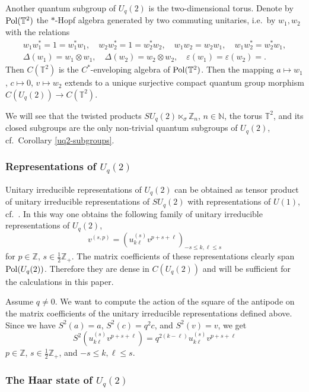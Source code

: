 \documentclass[12pt]{amsart}
\theoremstyle{definition}
\theoremstyle{remark}
\numberwithin{equation}{section}
\begin{document}
Another quantum subgroup of
$U_q(2)$ is the two-dimensional torus. Denote by ${\rm Pol}(\mathbb{T}^2)$ the
$*$-Hopf algebra generated by two commuting unitaries, i.e.\ by $w_1,w_2$ with
the relations
\begin{gather*}
w_1w_1^*=1=w_1^*w_1, \quad w_2w_2^*=1=w_2^*w_2,\quad w_1w_2=w_2w_1,\quad
w_1w_2^*=w_2^*w_1, \\
\Delta (w_1)=w_1\otimes w_1,\quad \Delta(w_2)=w_2\otimes w_2, \quad \varepsilon(w_1)=\varepsilon(w_2)=.
\end{gather*}
Then $C(\mathbb{T}^2)$ is the
$C^*$-enveloping algebra of ${\rm Pol}(\mathbb{T}^2)$. Then the mapping $a\mapsto w_1$, $c\mapsto 0$,
$v\mapsto w_2$ extends to a unique surjective compact quantum group morphism
$C(U_q(2))\to C(\mathbb{T}^2)$.

We will see that the twisted products $SU_q(2)\ltimes_\sigma \mathbb{Z}_n$,
$n\in\mathbb{N}$, the
torus $\mathbb{T}^2$, and its closed subgroups are the only non-trivial quantum subgroups of $U_q(2)$, cf.\ Corollary \ref{uq2-subgroups}.

\subsubsection{Representations of $U_q(2)$}

Unitary irreducible representations of $U_q(2)$ can be obtained as tensor
product of unitary irreducible representations of $SU_q(2)$ with
representations of $U(1)$, cf.\ \cite{wysoczanski04}. In this way one obtains
the following family of unitary irreducible representations of $U_q(2)$,
\[
v^{(s,p)} = \left(u^{(s)}_{k\ell}v^{p+s+\ell}\right)_{-s\le k,\ell\le s}
\]
for $p\in\mathbb{Z}$, $s\in\frac{1}{2}\mathbb{Z}_+$. The matrix coefficients of
these representations clearly span ${\rm Pol} (U_q(2))$. Therefore they are
dense in $C(U_q(2))$ and will be sufficient for the calculations in this
paper.

Assume $q\not=0$. We want to compute the action of the square of the antipode on the matrix coefficients of the 
unitary irreducible representations defined above. Since we have $S^2(a)=a$, $S^2(c)=q^2c$, and $S^2(v)=v$, we get
\begin{equation}\label{u2-s-squared}
S^2(u^{(s)}_{k\ell}v^{p+s+\ell}) =q^{2(k-\ell)}u^{(s)}_{k\ell}v^{p+s+\ell}
\end{equation}
$p\in\mathbb{Z}$, $s\in\frac{1}{2}\mathbb{Z}_+$, and $-s\le k,\ell\le s$.

\subsubsection{The Haar state of $U_q(2)$}
\end{document}
